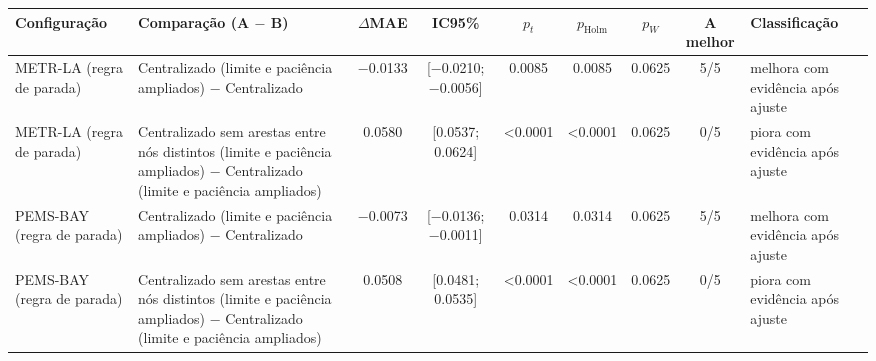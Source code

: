 
\begin{tabular}{>{\raggedright\arraybackslash}p{2.0cm}>{\raggedright\arraybackslash}p{5.0cm}cccccc>{\raggedright\arraybackslash}p{3.3cm}}
\toprule
Configuração & Comparação (A $-$ B) & $\Delta$MAE & IC95\% & $p_t$ & $p_{\mathrm{Holm}}$ & $p_W$ & A melhor & Classificação \\
\midrule
METR-LA (regra de parada) & Centralizado (limite e paciência ampliados) − Centralizado & \num{-0.0133} & [\num{-0.0210}; \num{-0.0056}] & \num{0.0085} & \num{0.0085} & \num{0.0625} & 5/5 & melhora com evidência após ajuste \\
METR-LA (regra de parada) & Centralizado sem arestas entre nós distintos (limite e paciência ampliados) − Centralizado (limite e paciência ampliados) & \num{+0.0580} & [\num{+0.0537}; \num{+0.0624}] & \num{<0.0001} & \num{<0.0001} & \num{0.0625} & 0/5 & piora com evidência após ajuste \\
PEMS-BAY (regra de parada) & Centralizado (limite e paciência ampliados) − Centralizado & \num{-0.0073} & [\num{-0.0136}; \num{-0.0011}] & \num{0.0314} & \num{0.0314} & \num{0.0625} & 5/5 & melhora com evidência após ajuste \\
PEMS-BAY (regra de parada) & Centralizado sem arestas entre nós distintos (limite e paciência ampliados) − Centralizado (limite e paciência ampliados) & \num{+0.0508} & [\num{+0.0481}; \num{+0.0535}] & \num{<0.0001} & \num{<0.0001} & \num{0.0625} & 0/5 & piora com evidência após ajuste \\
\bottomrule
\end{tabular}
